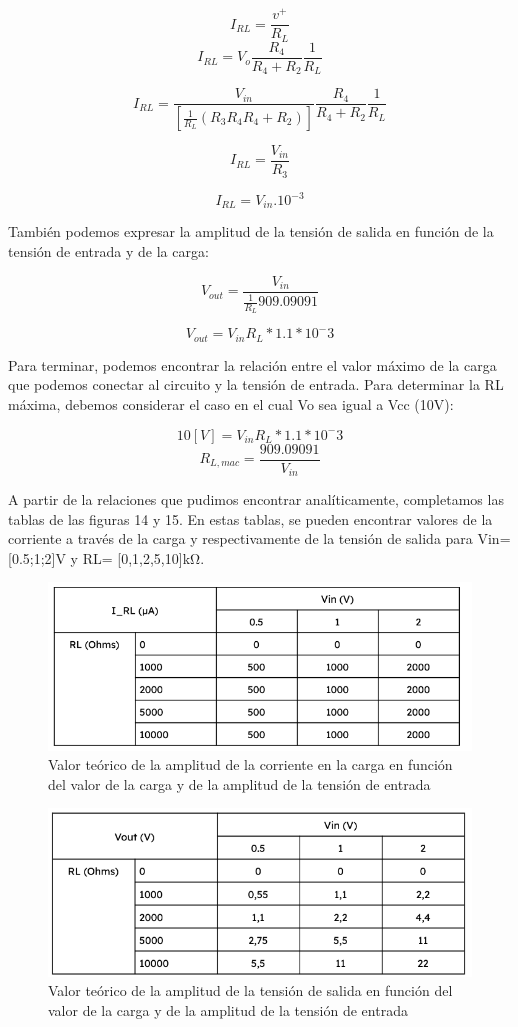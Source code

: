 \[I_{RL}= \frac{v^+}{R_L}\]
\[I_{RL}= V_o\frac{R_4}{R_4 + R_2} \frac{1}{R_L}\]


\[I_{RL}=\frac{V_{in}}{[\frac{1}{R_L}(R_3{R_4}{R_4 + R_2})]}\frac{R_4}{R_4 + R_2}\frac{1}{R_L}\]

\[I_{RL}= \frac{V_{in}}{R_3}\]

\[I_{RL}= V_{in}.10^{-3}\]

También podemos expresar la amplitud de la tensión de salida en función de la tensión de entrada y de la carga:

\[V_{out} = \frac{V_{in}}{\frac{1}{R_L}909.09091}\]

\[V_{out} = V_{in}R_L*1.1*10^-3\]

Para terminar, podemos encontrar la relación entre el valor máximo de la carga que podemos conectar al circuito y la tensión de entrada. Para determinar la RL máxima, debemos considerar el caso en el cual Vo sea igual a Vcc (10V):

\[10[V] = V_{in}R_L*1.1*10^-3\]
\[R_{L,mac} = \frac{909.09091}{V_{in}}\]


A partir de la relaciones que pudimos encontrar analíticamente, completamos las tablas de las figuras 14 y 15. En estas tablas, se pueden encontrar valores de la corriente a través de la carga y respectivamente de la tensión de salida para Vin=[0.5;1;2]V y RL= [0,1,2,5,10]kΩ.

\begin{figure}
    \centering
    \includegraphics[width=0.5\linewidth]{Secciones/Circuito2/Tabla3.png}
    \caption{Valor teórico de la amplitud de la corriente en la carga en función del valor de la carga y de la amplitud de la tensión de entrada}
    \label{fig:enter-label}
\end{figure}

\begin{figure}
    \centering
    \includegraphics[width=0.5\linewidth]{Secciones/Circuito2/Tabla4.png}
    \caption{Valor teórico de la amplitud de la tensión de salida en función del valor de la carga y de la amplitud de la tensión de entrada}
    \label{fig:enter-label}
\end{figure}

